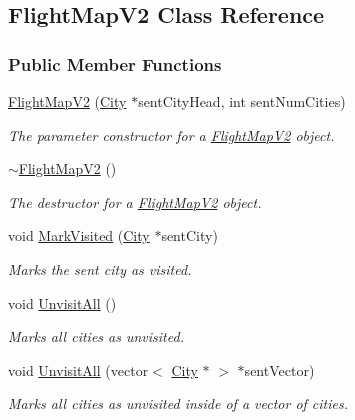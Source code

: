 \hypertarget{class_flight_map_v2}{}\subsection{Flight\+Map\+V2 Class Reference}
\label{class_flight_map_v2}
\subsubsection*{Public Member Functions}
\begin{DoxyCompactItemize}
\item 
\hyperlink{class_flight_map_v2_a25bea526c9472d199dd6299cde269155}{Flight\+Map\+V2} (\hyperlink{class_city}{City} $\ast$sent\+City\+Head, int sent\+Num\+Cities)
\begin{DoxyCompactList}\small\item\em The parameter constructor for a \hyperlink{class_flight_map_v2}{Flight\+Map\+V2} object. \end{DoxyCompactList}\item 
\hyperlink{class_flight_map_v2_acb9257412ce95c9c3e00e3403d2e23ef}{$\sim$\+Flight\+Map\+V2} ()
\begin{DoxyCompactList}\small\item\em The destructor for a \hyperlink{class_flight_map_v2}{Flight\+Map\+V2} object. \end{DoxyCompactList}\item 
void \hyperlink{class_flight_map_v2_aeee84b9d5e6350666dc11a07416cb7a7}{Mark\+Visited} (\hyperlink{class_city}{City} $\ast$sent\+City)
\begin{DoxyCompactList}\small\item\em Marks the sent city as visited. \end{DoxyCompactList}\item 
void \hyperlink{class_flight_map_v2_a9107cff9dcddfdd77b199c4bbdc719d1}{Unvisit\+All} ()
\begin{DoxyCompactList}\small\item\em Marks all cities as unvisited. \end{DoxyCompactList}\item 
void \hyperlink{class_flight_map_v2_ae863916273ba94e35d935347eebc3cbe}{Unvisit\+All} (vector$<$ \hyperlink{class_city}{City} $\ast$ $>$ $\ast$sent\+Vector)
\begin{DoxyCompactList}\small\item\em Marks all cities as unvisited inside of a vector of cities. \end{DoxyCompactList}\item 

\end{DoxyCompactItemize}
